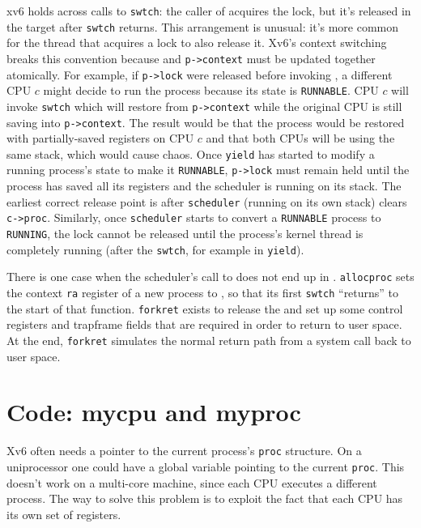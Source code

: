 xv6 holds
across calls to
\lstinline{swtch}:
the caller of
acquires the lock,
but it's released in the target after {\tt swtch} returns.
This arrangement is unusual: it's more common for
the thread that acquires a lock to also release it.
Xv6's context switching breaks this convention because
and
\lstinline{p->context}
must be updated together atomically.
For example, if
\lstinline{p->lock}
were released before invoking 
,
a different CPU $c$ might decide
to run the process because
its state is \lstinline{RUNNABLE}.
CPU $c$ will invoke \lstinline{swtch}
which will restore from \lstinline{p->context}
while the original CPU
is still saving into
\lstinline{p->context}.
The result would be that the process
would be restored with partially-saved registers on CPU $c$ and
that both CPUs will be using the same stack,
which would cause chaos.
Once \lstinline{yield} has started to modify a running process's state
to make it
\lstinline{RUNNABLE},
\lstinline{p->lock} must remain held until
the process has saved all its registers and
the scheduler is running on its stack.
The earliest correct release point is after
\lstinline{scheduler}
(running on its own stack)
clears
\lstinline{c->proc}.
Similarly, once 
\lstinline{scheduler}
starts to convert a \lstinline{RUNNABLE} process to
\lstinline{RUNNING},
the lock cannot be released until the process's kernel thread
is completely running (after the
\lstinline{swtch},
for example in
\lstinline{yield}).

There is one case when the scheduler's call to
does not end up in
.
\lstinline{allocproc} sets the context \lstinline{ra}
register of a new process to
,
so that its first \lstinline{swtch} ``returns'' 
to the start of that function.
\lstinline{forkret}
exists to release the 
and set up some control registers and trapframe
fields that are required in order to return to user space.
At the end, {\tt forkret} simulates the normal return
path from a system call back to user space.


\section{Code: mycpu and myproc}

Xv6 often needs a pointer to the current process's \lstinline{proc}
structure. On a uniprocessor one could have a global variable pointing
to the current \lstinline{proc}. This doesn't work on a multi-core
machine, since each CPU executes a different process. The way to
solve this problem is to exploit the fact that each CPU has its own
set of registers.

